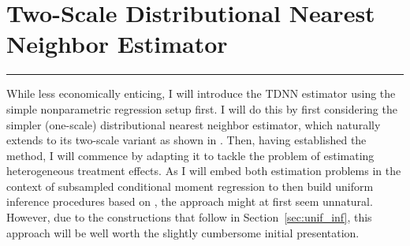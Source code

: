\section{Two-Scale Distributional Nearest Neighbor Estimator}\label{sec:TDNN}
\hrule
While less economically enticing, I will introduce the TDNN estimator using the simple nonparametric regression setup first.
I will do this by first considering the simpler (one-scale) distributional nearest neighbor estimator, which naturally extends to its two-scale variant as shown in \citet{demirkaya_optimal_2024}.
Then, having established the method, I will commence by adapting it to tackle the problem of estimating heterogeneous treatment effects.
As I will embed both estimation problems in the context of subsampled conditional moment regression to then build uniform inference procedures based on \citet{ritzwoller_uniform_2024}, the approach might at first seem unnatural.
However, due to the constructions that follow in Section~\ref{sec:unif_inf}, this approach will be well worth the slightly cumbersome initial presentation.

